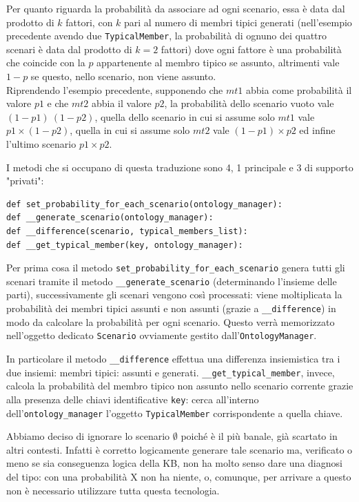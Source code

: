 Per quanto riguarda la probabilità da associare ad ogni scenario, essa è data dal 
prodotto di $ k $ fattori, con $ k $ pari al numero di membri tipici generati (nell’esempio
precedente avendo due \texttt{TypicalMember}, la probabilità di ognuno dei 
quattro scenari è data dal prodotto di $ k = 2 $ fattori) dove ogni fattore è una probabilità 
che coincide con la $ p $ appartenente al membro tipico  se assunto, 
altrimenti vale $ 1 - p $ se questo, nello scenario, non viene assunto.\\
Riprendendo l’esempio precedente, supponendo che $ mt1 $ abbia come probabilità il valore $ p1 $ 
e che $ mt2 $ abbia il valore $ p2 $, la probabilità dello scenario vuoto vale $ ( 1 - p1) \ ( 1 - p2)$,
quella dello scenario in cui si assume solo $ mt1 $ vale $ p1 \times ( 1 - p2) $, 
quella in cui si assume solo $ mt2 $ vale $ ( 1 - p1) \times p2 $ ed infine l’ultimo scenario $ p1 \times p2 $.

I metodi che si occupano di questa traduzione sono 4, 1 principale e 3 di supporto "privati":
\begin{verbatim}
def set_probability_for_each_scenario(ontology_manager):
def __generate_scenario(ontology_manager):
def __difference(scenario, typical_members_list):
def __get_typical_member(key, ontology_manager):
\end{verbatim}
Per prima cosa il metodo \texttt{set_probability_for_each_scenario} 
genera tutti gli scenari tramite il metodo \texttt{__generate_scenario} (determinando
l’insieme delle parti), successivamente gli scenari vengono così processati:
viene moltiplicata la probabilità dei membri tipici assunti e non assunti 
(grazie a \texttt{__difference}) in modo da calcolare la probabilità per ogni scenario.
Questo verrà memorizzato nell'oggetto dedicato \texttt{Scenario}
 ovviamente gestito dall'\texttt{OntologyManager}.

In particolare il metodo \texttt{__difference} effettua una 
differenza insiemistica tra i due insiemi: membri tipici: assunti e generati. 
\texttt{__get_typical_member}, invece, calcola la probabilità del membro tipico non assunto
nello scenario corrente grazie alla presenza delle chiavi identificative \texttt{key}:
cerca all'interno dell'\texttt{ontology_manager} l’oggetto \texttt{TypicalMember} corrispondente a quella chiave.

Abbiamo deciso di ignorare lo scenario $ \emptyset $ poiché è il più banale, già scartato in altri contesti.
Infatti è corretto logicamente generare tale scenario ma, verificato o meno se sia conseguenza logica della KB,
non ha molto senso dare una diagnosi del tipo: con una probabilità X non ha niente,
o, comunque, per arrivare a questo non è necessario utilizzare tutta questa tecnologia.

